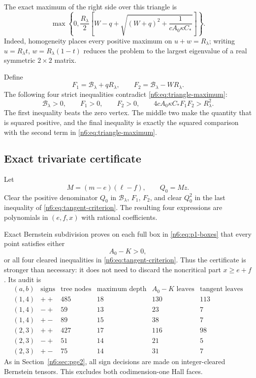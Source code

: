 \documentclass[11pt]{article}
\numberwithin{equation}{section}
\theoremstyle{definition}
\begin{document}
The exact maximum of the right side over this triangle is
\begin{equation}
 \max\left\{
 0,
 \frac{R_\lambda}{2}
 \left[
  W-q+\sqrt{(W+q)^2+\frac1{cA_0\kappa C_*}}
 \right]
 \right\}.\label{n6:eq:triangle-maximum}
\end{equation}
Indeed, homogeneity places every positive maximum on $u+w=R_\lambda$;
writing $u=R_\lambda t$, $w=R_\lambda(1-t)$ reduces the problem to the largest
eigenvalue of a real symmetric $2\times2$ matrix.

Define
\begin{equation}
 F_1=\mathcal B_\lambda+qR_\lambda,
 \qquad
 F_2=\mathcal B_\lambda-WR_\lambda.\label{n6:eq:F1F2}
\end{equation}
The following four strict inequalities contradict
\eqref{n6:eq:triangle-maximum}:
\begin{equation}
 \mathcal B_\lambda>0,
 \qquad F_1>0,
 \qquad F_2>0,
 \qquad
 4cA_0\kappa C_*F_1F_2>R_\lambda^2.\label{n6:eq:tangent-criterion}
\end{equation}
The first inequality beats the zero vertex.  The middle two make the quantity
that is squared positive, and the final inequality is exactly the squared
comparison with the second term in \eqref{n6:eq:triangle-maximum}.

\subsection{Exact trivariate certificate}

Let
\[
 M=(m-e)(\ell-f),
 \qquad
 Q_0=Mz.
\]
Clear the positive denominator $Q_0$ in
$\mathcal B_\lambda$, $F_1$, $F_2$, and clear $Q_0^2$ in the last inequality
of \eqref{n6:eq:tangent-criterion}.  The resulting four expressions are
polynomials in $(e,f,x)$ with rational coefficients.

Exact Bernstein subdivision proves on each full box in
\eqref{n6:eq:p1-boxes} that every point satisfies either
\[
 A_0-K>0,
\]
or all four cleared inequalities in \eqref{n6:eq:tangent-criterion}.  Thus the
certificate is stronger than necessary: it does not need to discard the
noncritical part $x\ge e+f$.  Its audit is
\begin{equation}
\begin{array}{c|c|c|c|c|c}
(a,b)&\text{signs}&\text{tree nodes}&\text{maximum depth}&
 A_0-K\text{ leaves}&\text{tangent leaves}\\ \hline
(1,4)&++&485&18&130&113\\
(1,4)&-+&59&13&23&7\\
(1,4)&+-&89&15&38&7\\
(2,3)&++&427&17&116&98\\
(2,3)&-+&51&14&21&5\\
(2,3)&+-&75&14&31&7
\end{array}\label{n6:eq:p1-audit}
\end{equation}
As in Section~\ref{n6:sec:pge2}, all sign decisions are made on
integer-cleared Bernstein tensors.  This excludes both codimension-one Hall
faces.
\end{document}
